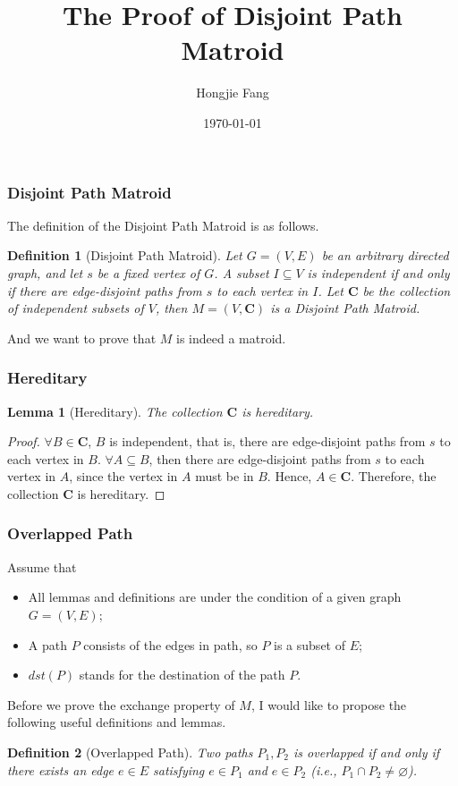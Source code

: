 \documentclass[notheorems]{beamer}
\newtheorem{lemma}[theorem]{Lemma}
\newtheorem{definition}{Definition}
\begin{document}
\title[The Proof of Disjoint Path Matroid]{The Proof of Disjoint Path Matroid}
\author[Hongjie Fang]{Hongjie Fang}
\date[\today]{\today}
\frame{\titlepage}

\begin{frame}
\frametitle{Disjoint Path Matroid}
The definition of the Disjoint Path Matroid is as follows.
\begin{definition}[Disjoint Path Matroid]
Let $G = (V,E)$ be an arbitrary directed graph, and let $s$ be a fixed vertex of $G$. A subset $I \subseteq V$ is independent if and only if there are edge-disjoint paths from $s$ to each vertex in $I$. Let $\mathbf{C}$ be the collection of independent subsets of $V$, then $M = (V, \mathbf{C})$ is a Disjoint Path Matroid.
\end{definition}
And we want to prove that $M$ is indeed a matroid.
\end{frame}

\begin{frame}
\frametitle{Hereditary}
\begin{lemma}[Hereditary]
The collection $\mathbf{C}$ is hereditary.
\end{lemma}
\begin{proof}
$\forall B \in \mathbf{C}$, $B$ is independent, that is, there are edge-disjoint paths from $s$ to each vertex in $B$. $\forall A \subseteq B$, then there are edge-disjoint paths from $s$ to each vertex in $A$, since the vertex in $A$ must be in $B$. Hence, $A \in \mathbf{C}$.
Therefore, the collection $\mathbf{C}$ is hereditary.
\end{proof}
\end{frame}

\begin{frame}
\frametitle{Overlapped Path}
Assume that
\begin{itemize}
  \item All lemmas and definitions are under the condition of a given graph $G=(V,E)$;
  \item A path $P$ consists of the edges in path, so $P$ is a subset of $E$;
  \item $dst(P)$ stands for the destination of the path $P$.
\end{itemize}
\pause
Before we prove the exchange property of $M$, I would like to propose the following useful definitions and lemmas.
\begin{definition}[Overlapped Path]
Two paths $P_1, P_2$ is overlapped if and only if there exists an edge $e \in E$ satisfying $e \in P_1$ and $e \in P_2$ (i.e., $P_1 \cap P_2 \ne \varnothing$).
\end{definition}
\end{frame}
\end{document}
